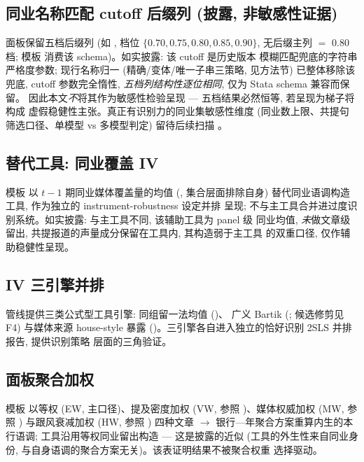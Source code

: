 \subsection{同业名称匹配 cutoff 后缀列 (披露, 非敏感性证据)}
面板保留五档后缀列 (如 , 档位
$\{0.70, 0.75, 0.80, 0.85, 0.90\}$, 无后缀主列 $=$ 0.80 档; 模板 
消费该 schema)。如实披露: 该 cutoff 是历史版本  模糊匹配兜底的字符串
严格度参数; 现行名称归一 (精确/变体/唯一子串三策略, 见方法节) 已整体移除该兜底,
cutoff 参数完全惰性, \emph{五档列结构性逐位相同}, 仅为 Stata schema 兼容而保留。
因此本文\emph{不}将其作为敏感性检验呈现 --- 五档结果必然恒等, 若呈现为梯子将构成
虚假稳健性主张。真正有识别力的同业集敏感性维度 (同业数上限、共提句筛选口径、单模型
vs 多模型判定) 留待后续扫描 。

\subsection{替代工具: 同业覆盖 IV}
模板  以 $t-1$ 期同业媒体覆盖量的均值 (,
集合层面排除自身) 替代同业语调构造工具, 作为独立的 instrument-robustness 设定并排
呈现; 不与主工具合并进过度识别系统。如实披露: 与主工具不同, 该辅助工具为 panel 级
同业均值, \emph{未}做文章级留出, 共提报道的声量成分保留在工具内, 其构造弱于主工具
的双重口径, 仅作辅助稳健性呈现。

\subsection{IV 三引擎并排}
管线提供三类公式型工具引擎: 同组留一法均值 ()、
广义 Bartik (; 候选修剪见 F4) 与媒体来源 house-style 暴露
()。三引擎各自进入独立的恰好识别 2SLS 并排报告, 提供识别策略
层面的三角验证。

\subsection{面板聚合加权}
模板  以等权 (EW, 主口径)、提及密度加权 (VW, 参照
\textcite{hassan2019firm})、媒体权威加权 (MW, 参照 \textcite{holzman2023curbing})
与跟风衰减加权 (HW, 参照 \textcite{tetlock2011stale}) 四种文章 $\rightarrow$
银行—年聚合方案重算内生的本行语调; 工具沿用等权同业留出构造 --- 这是披露的近似
(工具的外生性来自同业身份, 与自身语调的聚合方案无关)。该表证明结果不被聚合权重
选择驱动。

